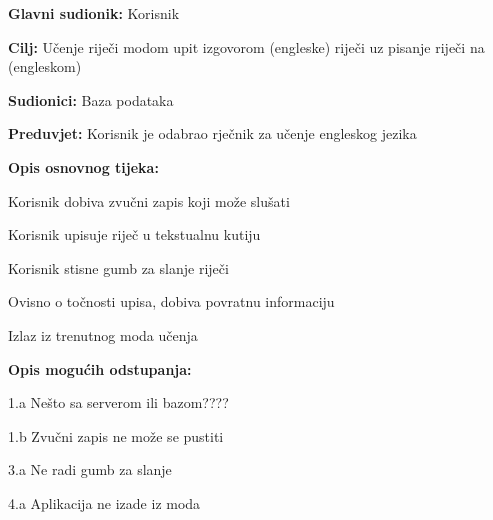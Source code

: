 					\noindent {}
					\begin{packed_item}
						\item \textbf{Glavni sudionik:} Korisnik
						\item \textbf{Cilj:} Učenje riječi modom upit izgovorom (engleske) riječi uz pisanje riječi na (engleskom)
						\item \textbf{Sudionici:} Baza podataka
						\item \textbf{Preduvjet:} Korisnik je odabrao rječnik za učenje engleskog jezika
						\item \textbf{Opis osnovnog tijeka:}
						\begin{packed_enum}
							\item Korisnik dobiva zvučni zapis koji može slušati
							\item Korisnik upisuje riječ u tekstualnu kutiju
							\item Korisnik stisne gumb za slanje riječi
							\item Ovisno o točnosti upisa, dobiva povratnu informaciju
							\item Izlaz iz trenutnog moda učenja
						\end{packed_enum}
						\item \textbf{Opis mogućih odstupanja:}
						\begin{packed_item}
							\item 1.a Nešto sa serverom ili bazom????
							\item 1.b Zvučni zapis ne može se pustiti
							\item 3.a Ne radi gumb za slanje
							\item 4.a Aplikacija ne izade iz moda
						\end{packed_item}
					\end{packed_item}

